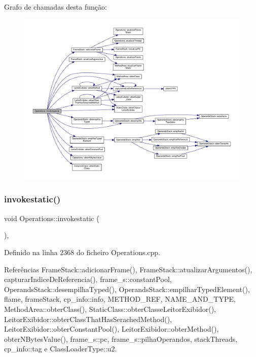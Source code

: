 Grafo de chamadas desta função\+:
\nopagebreak
\begin{figure}[H]
\begin{center}
\leavevmode
\includegraphics[width=350pt]{classOperations_ab561e27c8450ceec7e4f8b0a155fcda3_cgraph}
\end{center}
\end{figure}
\mbox{\label{classOperations_a562d8c9cc5975de2ee6d1a95e1969724}} 
\subsubsection{\texorpdfstring{invokestatic()}{invokestatic()}}
{\footnotesize\ttfamily void Operations\+::invokestatic (\begin{DoxyParamCaption}{ }\end{DoxyParamCaption})\hspace{0.3cm}{\ttfamily [static]}, {\ttfamily [private]}}



Definido na linha 2368 do ficheiro Operations.\+cpp.



Referências Frame\+Stack\+::adicionar\+Frame(), Frame\+Stack\+::atualizar\+Argumentos(), capturar\+Indice\+De\+Referencia(), frame\+\_\+s\+::constant\+Pool, Operands\+Stack\+::desempilha\+Typed(), Operands\+Stack\+::empilhar\+Typed\+Element(), flame, frame\+Stack, cp\+\_\+info\+::info, M\+E\+T\+H\+O\+D\+\_\+\+R\+EF, N\+A\+M\+E\+\_\+\+A\+N\+D\+\_\+\+T\+Y\+PE, Method\+Area\+::obter\+Class(), Static\+Class\+::obter\+Classe\+Leitor\+Exibidor(), Leitor\+Exibidor\+::obter\+Class\+That\+Has\+Serached\+Method(), Leitor\+Exibidor\+::obter\+Constant\+Pool(), Leitor\+Exibidor\+::obter\+Method(), obter\+N\+Bytes\+Value(), frame\+\_\+s\+::pc, frame\+\_\+s\+::pilha\+Operandos, stack\+Threads, cp\+\_\+info\+::tag e Class\+Loader\+Type\+::u2.

